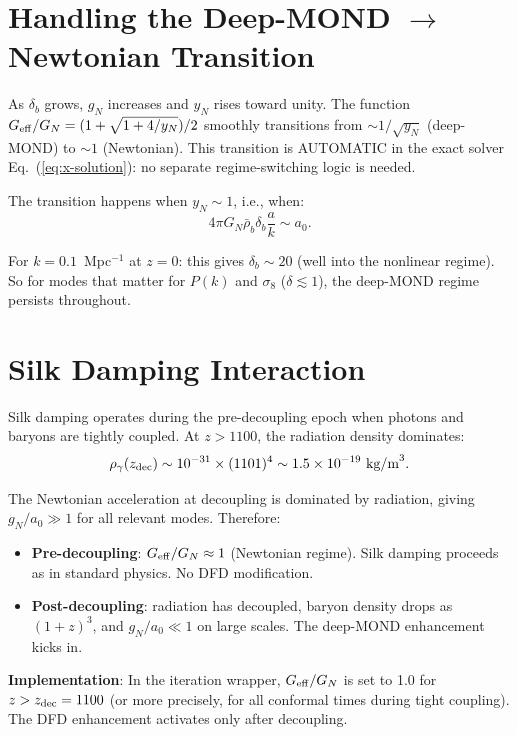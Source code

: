 \documentclass[11pt]{article}
\theoremstyle{definition}
\theoremstyle{remark}
\newcommand{\ee}[1]{\times 10^{#1}}
\newcommand{\Geff}{G_{\rm eff}}
\begin{document}
\section{Handling the Deep-MOND $\to$ Newtonian Transition}

As $\delta_b$ grows, $g_N$ increases and $y_N$ rises toward unity.
The function $\Geff/G_N = (1 + \sqrt{1 + 4/y_N})/2$ smoothly
transitions from $\sim 1/\sqrt{y_N}$ (deep-MOND) to $\sim 1$
(Newtonian). This transition is AUTOMATIC in the exact solver
Eq.~(\ref{eq:x-solution}): no separate regime-switching logic is needed.

The transition happens when $y_N \sim 1$, i.e., when:
\begin{equation}
4\pi G_N \bar\rho_b \delta_b \frac{a}{k} \sim a_0.
\end{equation}

For $k = 0.1$~Mpc$^{-1}$ at $z = 0$: this gives $\delta_b \sim 20$
(well into the nonlinear regime). So for modes that matter for $P(k)$
and $\sigma_8$ ($\delta \lesssim 1$), the deep-MOND regime persists
throughout.

\section{Silk Damping Interaction}

Silk damping operates during the pre-decoupling epoch when photons
and baryons are tightly coupled. At $z > 1100$, the radiation
density dominates:
\begin{equation}
\rho_\gamma(z_{\rm dec}) \sim 10^{-31} \times (1101)^4
\sim 1.5\ee{-19}~\text{kg/m}^3.
\end{equation}

The Newtonian acceleration at decoupling is dominated by radiation,
giving $g_N/a_0 \gg 1$ for all relevant modes. Therefore:
\begin{itemize}
\item \textbf{Pre-decoupling}: $\Geff/G_N \approx 1$ (Newtonian regime).
  Silk damping proceeds as in standard physics. No DFD modification.
\item \textbf{Post-decoupling}: radiation has decoupled, baryon density
  drops as $(1+z)^3$, and $g_N/a_0 \ll 1$ on large scales. The deep-MOND
  enhancement kicks in.
\end{itemize}

\textbf{Implementation}: In the iteration wrapper, $\Geff/G_N$ is set
to 1.0 for $z > z_{\rm dec} = 1100$ (or more precisely, for all conformal
times during tight coupling). The DFD enhancement activates only after
decoupling.
\end{document}
